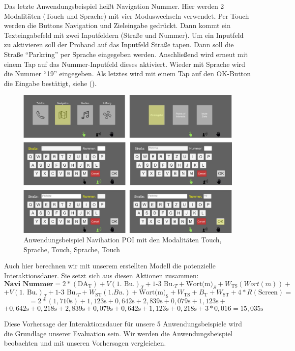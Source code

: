 Das letzte Anwendungsbeispiel heißt Navigation Nummer. Hier werden 2 Modalitäten (Touch und Sprache) mit vier Moduswechseln verwendet. Per Touch werden die Buttons Navigation und Zieleingabe gedrückt. Dann kommt ein Texteingabefeld mit zwei Inputfeldern (Straße und Nummer). Um ein Inputfeld zu aktivieren soll der Proband auf das Inputfeld Straße tapen. Dann soll die Straße "`Parkring"' per Sprache eingegeben werden. Anschließend wird erneut mit einem Tap auf das Nummer-Inputfeld	dieses aktiviert. Wieder mit Sprache wird die Nummer "`19"' eingegeben. Als letztes wird mit einem Tap auf den OK-Button die Eingabe bestätigt, siehe ().
\begin{figure}
	\centering
		\includegraphics[width=1\textwidth]{img/UseCases_Eval_Navi_Nummer.jpg}
	\caption{Anwendungsbeispiel Navihation POI mit den Modalitäten Touch, Sprache, Touch, Sprache, Touch}
	\label{fig:UseCasesEvalNaviNummer}
\end{figure}	
Auch hier berechnen wir mit unserem erstellten Modell die potenzielle Interaktionsdauer. Sie setzt sich aus diesen Aktionen zusammen:
\[
\textbf{Navi Nummer} = 2*(\text{DA}_\text{T}) + V(\text{1. Bu.})_T + \text{1-3 Bu.}_T + \text{Wort(m)}_S + W_\text{TS}(Wort(m)) +
\]
\[
+ V(\text{1. Bu.})_T + \text{1-3 Bu.}_T + W_\text{ST}(1. Bu.) + \text{Wort(m)}_\text{S} + W_\text{TS} + B_\text{T} + W_\text{ST} + 4*R(\text{Screen}) =
\]
\[
= 2*( 1,710\text{s}) +  1,123\text{s} + 0,642\text{s} + 2,839\text{s} + 0,079\text{s} + 1,123\text{s} + 
\]
\[
+ 0,642\text{s} + 0,218\text{s} + 2,839\text{s} + 0,079\text{s} + 0,642\text{s} + 1,123\text{s} + 0,218\text{s} + 3*0,016 = 15,035\text{s}
\]

Diese Vorhersage der Interaktionsdauer für unsere 5 Anwendungsbeispiele wird die Grundlage unserer Evaluation sein. Wir werden die Anwendungsbeispiel beobachten und mit unseren Vorhersagen vergleichen. 

